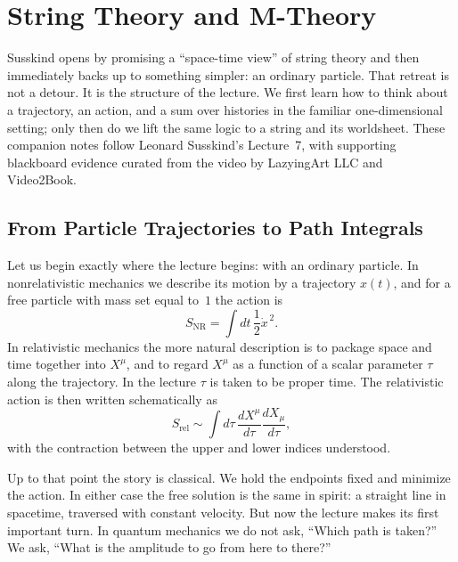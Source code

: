 \chapter{String Theory and M-Theory}

Susskind opens by promising a ``space-time view'' of string theory and then immediately backs up to something simpler: an ordinary particle. That retreat is not a detour. It is the structure of the lecture. We first learn how to think about a trajectory, an action, and a sum over histories in the familiar one-dimensional setting; only then do we lift the same logic to a string and its worldsheet. These companion notes follow Leonard Susskind's Lecture~7, with supporting blackboard evidence curated from the video by LazyingArt LLC and Video2Book.

\section{From Particle Trajectories to Path Integrals}

Let us begin exactly where the lecture begins: with an ordinary particle. In nonrelativistic mechanics we describe its motion by a trajectory \(x(t)\), and for a free particle with mass set equal to~\(1\) the action is
\begin{equation}
S_{\mathrm{NR}}=\int dt\,\frac12 \dot{x}^{\,2}.
\end{equation}
In relativistic mechanics the more natural description is to package space and time together into \(X^\mu\), and to regard \(X^\mu\) as a function of a scalar parameter \(\tau\) along the trajectory. In the lecture \(\tau\) is taken to be proper time. The relativistic action is then written schematically as
\begin{equation}
S_{\mathrm{rel}}\sim \int d\tau\,\frac{dX^\mu}{d\tau}\frac{dX_\mu}{d\tau},
\end{equation}
with the contraction between the upper and lower indices understood.

Up to that point the story is classical. We hold the endpoints fixed and minimize the action. In either case the free solution is the same in spirit: a straight line in spacetime, traversed with constant velocity. But now the lecture makes its first important turn. In quantum mechanics we do not ask, ``Which path is taken?'' We ask, ``What is the amplitude to go from here to there?''

